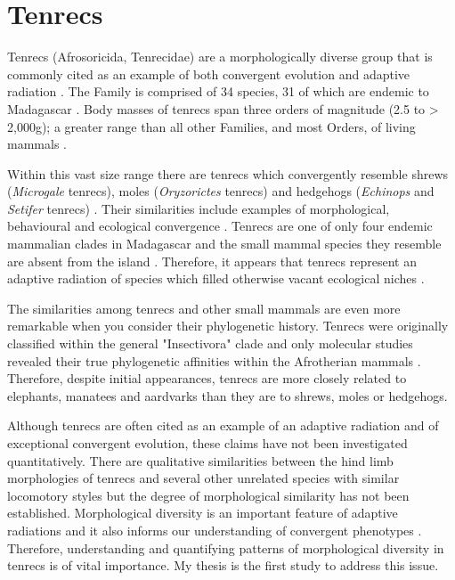 \section{Tenrecs} %
	Tenrecs (Afrosoricida, Tenrecidae) are a morphologically diverse group that is commonly cited as an example of both convergent evolution and adaptive radiation \citep{Soarimalala2011, Eisenberg1969}. %
	The Family is comprised of 34 species, 31 of which are endemic to Madagascar \citep{Olson2013}. Body masses of tenrecs span three orders of magnitude (2.5 to > 2,000g); a greater range than all other Families, and most Orders, of living mammals \citep{Olson2003}.
	
	Within this vast size range there are tenrecs which convergently resemble shrews (\textit{Microgale} tenrecs), moles (\textit{Oryzorictes} tenrecs) and hedgehogs (\textit{Echinops} and \textit{Setifer} tenrecs) \citep{Eisenberg1969}. Their similarities include examples of morphological, behavioural and ecological convergence \citep{Soarimalala2011}. Tenrecs are one of only four endemic mammalian clades in Madagascar and the small mammal species they resemble are absent from the island \citep{Garbutt1999}. Therefore, it appears that tenrecs represent an adaptive radiation of species which filled otherwise vacant ecological niches \citep{Soarimalala2011}.

	The similarities among tenrecs and other small mammals are even more remarkable when you consider their phylogenetic history. Tenrecs were originally classified within the general "Insectivora" clade and only molecular studies revealed their true phylogenetic affinities within the Afrotherian mammals \citep{Stanhope1998}. Therefore, despite initial appearances, tenrecs are more closely related to elephants, manatees and aardvarks than they are to shrews, moles or hedgehogs. 

	Although tenrecs are often cited as an example of an adaptive radiation and of exceptional convergent evolution, these claims have not been investigated quantitatively. There are qualitative similarities between the hind limb morphologies of tenrecs and several other unrelated species with similar locomotory styles \citep{Salton2009} but the degree of morphological similarity has not been established. Morphological diversity is an important feature of adaptive radiations \citep{Losos2010a} and it also informs our understanding of convergent phenotypes \citep{Muschick2012}. Therefore, understanding and quantifying patterns of morphological diversity in tenrecs is of vital importance.
	 My thesis is the first study to address this issue. 

